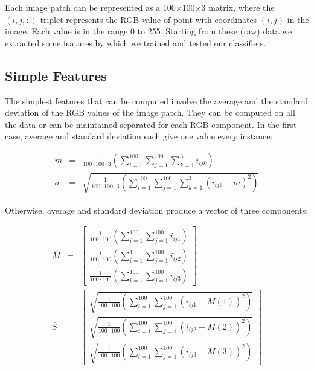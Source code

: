 Each image patch can be represented as a 100$\times$100$\times$3 matrix, where the $(i,j,:)$ triplet represents the RGB value of point with coordinates $(i,j)$ in the image.
Each value is in the range 0 to 255. Starting from these (raw) data we extracted some features by which we trained and tested our classifiers.

\vspace{0.5cm}

\subsection{Simple Features}
\label{ch4:sf}

The simplest features that can be computed involve the average and the standard deviation of the \Gls{RGB} values of the image patch. They can be computed on all the data or can be maintained separated
for each \Gls{RGB} component. In the first case, average and standard deviation each give one value every instance:

\begin{eqnarray}
 m & = & \frac{1}{100\cdot100\cdot3} \left( \sum_{i=1}^{100} \sum_{j=1}^{100} \sum_{k=1}^{3} i_{ijk} \right) \\
 \sigma & = & \sqrt{\frac{1}{100\cdot100\cdot3} \left( \sum_{i=1}^{100} \sum_{j=1}^{100} \sum_{k=1}^{3} (i_{ijk} - m )^2 \right)}
\end{eqnarray}

Otherwise, average and standard deviation produce a vector of three components:

\begin{eqnarray}
 \overline{M} & = & \left[ \begin{array}{c}
                            \frac{1}{100\cdot100} \left( \sum_{i=1}^{100} \sum_{j=1}^{100} i_{ij1} \right) \\
                            \frac{1}{100\cdot100} \left( \sum_{i=1}^{100} \sum_{j=1}^{100} i_{ij2} \right) \\
                            \frac{1}{100\cdot100} \left( \sum_{i=1}^{100} \sum_{j=1}^{100} i_{ij3} \right)
                           \end{array} \right] \\
 \overline{S} & = & \left[ \begin{array}{c}
                                 \sqrt{\frac{1}{100\cdot100} \left( \sum_{i=1}^{100} \sum_{j=1}^{100} (i_{ij1} - M(1) )^2 \right)} \\
                                 \sqrt{\frac{1}{100\cdot100} \left( \sum_{i=1}^{100} \sum_{j=1}^{100} (i_{ij2} - M(2) )^2 \right)} \\
                                 \sqrt{\frac{1}{100\cdot100} \left( \sum_{i=1}^{100} \sum_{j=1}^{100} (i_{ij3} - M(3) )^2 \right)}
                                \end{array}  \right]
\end{eqnarray}

